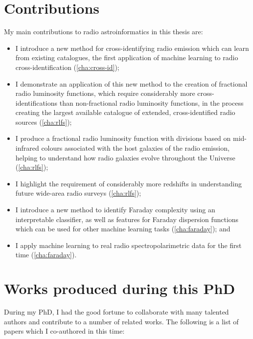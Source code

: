 \documentclass[11pt, a4paper]{book}
\begin{document}
\section{Contributions}
\label{sec:contributions}

My main contributions to radio astroinformatics in this thesis are:
\begin{itemize}
    \item I introduce a new method for cross-identifying radio emission which can learn from existing catalogues, the first application of machine learning to radio cross-identification (\autoref{cha:cross-id});
    \item I demonstrate an application of this new method to the creation of fractional radio luminosity functions, which require considerably more cross-identifications than non-fractional radio luminosity functions, in the process creating the largest available catalogue of extended, cross-identified radio sources (\autoref{cha:rlfs});
    \item I produce a fractional radio luminosity function with divisions based on mid-infrared colours associated with the host galaxies of the radio emission, helping to understand how radio galaxies evolve throughout the Universe (\autoref{cha:rlfs});
    \item I highlight the requirement of considerably more redshifts in understanding future wide-area radio surveys (\autoref{cha:rlfs});
    \item I introduce a new method to identify Faraday complexity using an interpretable classifier, as well as features for Faraday dispersion functions which can be used for other machine learning tasks (\autoref{cha:faraday}); and
    \item I apply machine learning to real radio spectropolarimetric data for the first time (\autoref{cha:faraday}).
\end{itemize}

\newpage

\section{Works produced during this PhD}
\label{sec:works}

During my PhD, I had the good fortune to collaborate with many talented authors and contribute to a number of related works. The following is a list of papers which I co-authored in this time:
\end{document}
